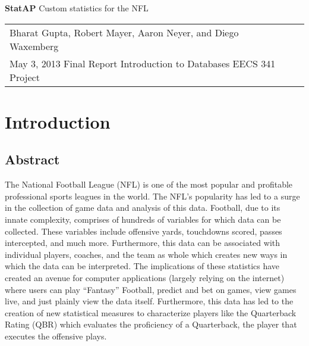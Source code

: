 \documentclass[12pt,letterpaper]{article}
\begin{document}

\newpage
\pagestyle{fancy}
\fancyhf{}
\vspace*{6cm}
\begin{center}
{\huge \bf StatAP}
\linebreak
\vspace{1cm}
\large {Custom statistics for the NFL}
\vspace{1cm}
\end{center}
\vfill
\begin{center}
\begin{tabular}{ll}
Bharat Gupta, Robert Mayer, Aaron Neyer, and Diego Waxemberg\\
May 3, 2013
Final Report
Introduction to Databases EECS 341 Project
\end{tabular}
\end{center}


\newpage
\pagestyle{fancy}
\fancyhf{}

\fancyhead[L]{\small \rm \textit{\rightmark}}
\fancyhead[R]{\small \rm \textbf{\thepage}}

\renewcommand{\sectionmark}[1]{\markright{\thesection.\ #1}}
\renewcommand{\headrulewidth}{0.5pt}
\renewcommand{\footrulewidth}{0.5pt}


\tableofcontents

\newpage
\section{Introduction}

\subsection{Abstract}
The National Football League (NFL) is one of the most popular and profitable professional sports leagues in the world. The NFL’s popularity has led to a surge in the collection of game data and analysis of this data. Football, due to its innate complexity, comprises of hundreds of variables for which data can be collected. These variables include offensive yards, touchdowns scored, passes intercepted, and much more. Furthermore, this data can be associated with individual players, coaches, and the team as whole which creates new ways in which the data can be interpreted. The implications of these statistics have created an avenue for computer applications (largely relying on the internet) where users can play “Fantasy” Football, predict and bet on games, view games live, and just plainly view the data itself. Furthermore, this data has led to the creation of new statistical measures to characterize players like the Quarterback Rating (QBR) which evaluates the proficiency of a Quarterback, the player that executes the offensive plays. \\
\end{document}

